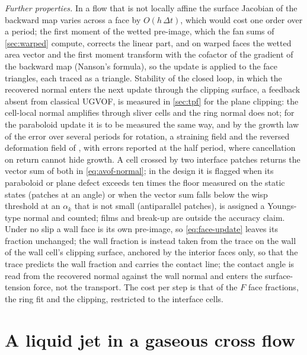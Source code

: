 \documentclass[preprint,12pt]{elsarticle}
\begin{document}
\emph{Further properties.} In a flow that is not locally affine the surface Jacobian of the backward map varies across a face by $O(h\,\Delta t)$, which would cost one order over a period; the first moment of the wetted pre-image, which the fan sums of \cref{sec:warped} compute, corrects the linear part, and on warped faces the wetted area vector and the first moment transform with the cofactor of the gradient of the backward map (Nanson's formula), so the update is applied to the face triangles, each traced as a triangle. Stability of the closed loop, in which the recovered normal enters the next update through the clipping surface, a feedback absent from classical UGVOF, is measured in \cref{sec:tpf} for the plane clipping: the cell-local normal amplifies through sliver cells and the ring normal does not; for the paraboloid update it is to be measured the same way, and by the growth law of the error over several periods for rotation, a straining field and the reversed deformation field of \citet{LeVeque1996}, with errors reported at the half period, where cancellation on return cannot hide growth. A cell crossed by two interface patches returns the vector sum of both in \cref{eq:avof-normal}; in the design it is flagged when its paraboloid or plane defect exceeds ten times the floor measured on the static states (patches at an angle) or when the vector sum falls below the wisp threshold at an $\alpha_k$ that is not small (antiparallel patches), is assigned a Youngs-type normal \citep{Youngs1982} and counted; films and break-up are outside the accuracy claim. Under no slip a wall face is its own pre-image, so \cref{eq:face-update} leaves its fraction unchanged; the wall fraction is instead taken from the trace on the wall of the wall cell's clipping surface, anchored by the interior faces only, so that the trace predicts the wall fraction and carries the contact line; the contact angle is read from the recovered normal against the wall normal and enters the surface-tension force, not the transport. The cost per step is that of the $F$ face fractions, the ring fit and the clipping, restricted to the interface cells.

\section{A liquid jet in a gaseous cross flow}
\label{sec:jet}
\end{document}
